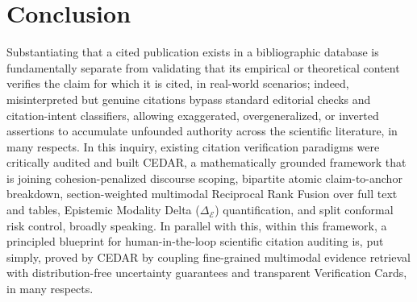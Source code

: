 \documentclass[sigconf]{acmart}
\begin{document}
\section{Conclusion}
\label{sec:conclusion}

Substantiating that a cited publication exists in a bibliographic database is fundamentally separate from validating that its empirical or theoretical content verifies the claim for which it is cited, in real-world scenarios; indeed, misinterpreted but genuine citations bypass standard editorial checks and citation-intent classifiers, allowing exaggerated, overgeneralized, or inverted assertions to accumulate unfounded authority across the scientific literature, in many respects. In this inquiry, existing citation verification paradigms were critically audited and built CEDAR, a mathematically grounded framework that is joining cohesion-penalized discourse scoping, bipartite atomic claim-to-anchor breakdown, section-weighted multimodal Reciprocal Rank Fusion over full text and tables, Epistemic Modality Delta ($\Delta_{\mathcal{E}}$) quantification, and split conformal risk control, broadly speaking. In parallel with this, within this framework, a principled blueprint for human-in-the-loop scientific citation auditing is, put simply, proved by CEDAR by coupling fine-grained multimodal evidence retrieval with distribution-free uncertainty guarantees and transparent Verification Cards, in many respects.
\end{document}
